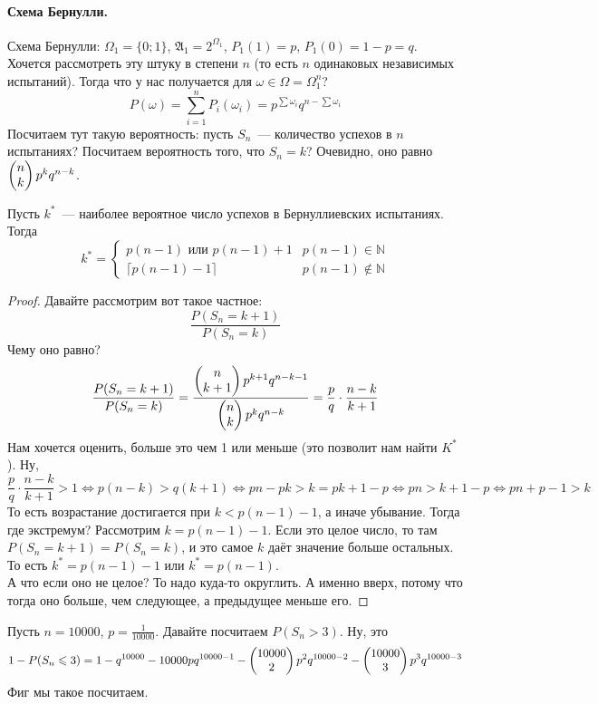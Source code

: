 \documentclass{article}
\newcommand{\A}{{\mathfrak A}}
\begin{document}
    \paragraph{Схема Бернулли.}
    \begin{example}
        Схема Бернулли: $\Omega_1=\{0;1\}$, $\A_1=2^{\Omega_1}$, $P_1(1)=p$, $P_1(0)=1-p=q$. Хочется рассмотреть эту штуку в степени $n$ (то есть $n$ одинаковых независимых испытаний). Тогда что у нас получается для $\omega\in\Omega=\Omega_1^n$?
        $$
        P(\omega)=\sum\limits_{i=1}^nP_i(\omega_i)=p^{\sum\omega_i}q^{n-\sum\omega_i}
        $$
        Посчитаем тут такую вероятность: пусть $S_n$~--- количество успехов в $n$ испытаниях? Посчитаем вероятность того, что $S_n=k$? Очевидно, оно равно $\left(\begin{matrix}n\\k\end{matrix}\right)p^kq^{n-k}$.
    \end{example}
    \begin{claim}
        Пусть $k^*$~--- наиболее вероятное число успехов в Бернуллиевских испытаниях. Тогда
        $$
        k^*=\begin{cases}
            p(n-1)\text{ или }p(n-1)+1 & p(n-1)\in\mathbb N\\
            \lceil p(n-1)-1\rceil & p(n-1)\notin\mathbb N
        \end{cases}
        $$
    \end{claim}
    \begin{proof}
        Давайте рассмотрим вот такое частное:
        $$
        \frac{P(S_n=k+1)}{P(S_n=k)}
        $$
        Чему оно равно?
        $$
        \frac{P(S_n=k+1)}{P(S_n=k)}=\frac{\left(\begin{matrix}n\\k+1\end{matrix}\right)p^{k+1}q^{n-k-1}}{\left(\begin{matrix}n\\k\end{matrix}\right)p^kq^{n-k}}=\frac pq\cdot\frac{n-k}{k+1}
        $$
        Нам хочется оценить, больше это чем 1 или меньше (это позволит нам найти $K^*$). Ну,
        $$
        \frac pq\cdot\frac{n-k}{k+1}>1\Leftrightarrow p(n-k)>q(k+1)\Leftrightarrow pn-pk>k=pk+1-p\Leftrightarrow pn>k+1-p\Leftrightarrow pn+p-1>k
        $$
        То есть возрастание достигается при $k<p(n-1)-1$, а иначе убывание. Тогда где экстремум? Рассмотрим $k=p(n-1)-1$. Если это целое число, то там $P(S_n=k+1)=P(S_n=k)$, и это самое $k$ даёт значение больше остальных. То есть $k^*=p(n-1)-1$ или $k^*=p(n-1)$.\\
        А что если оно не целое? То надо куда-то округлить. А именно вверх, потому что тогда оно больше, чем следующее, а предыдущее меньше его.
    \end{proof}
    \begin{example}
        Пусть $n=10000$, $p=\frac1{10000}$. Давайте посчитаем $P(S_n>3)$. Ну, это
        $$
        1-P(S_n\leqslant 3)=1-q^{10000}-10000pq^{10000-1}-\left(\begin{matrix}10000\\2\end{matrix}\right)p^2q^{10000-2}-\left(\begin{matrix}10000\\3\end{matrix}\right)p^3q^{10000-3}
        $$
        Фиг мы такое посчитаем.
    \end{example}
\end{document}
